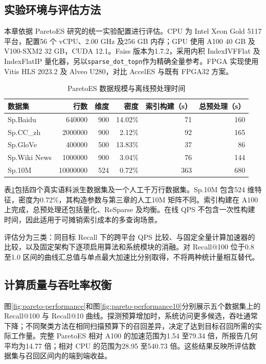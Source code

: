 \subsection{实验环境与评估方法}
本章依据 ParetoES 研究的统一实验配置进行评估\cite{paretoes2026}。CPU 为 Intel Xeon Gold 5117 平台，配置56 个 vCPU、2.00 GHz 及256 GB 内存；GPU 使用 A100 40 GB 及 V100-SXM2 32 GB，CUDA 12.1。Faiss 版本为1.7.2，采用内积 IndexIVFFlat 及 IndexFlatIP 量化器，另以\texttt{sparse\_dot\_topn}作为精确全量参考。FPGA 实现使用 Vitis HLS 2023.2 及 Alveo U280，对比 AccelES 与既有 FPGA32 方案。

\begin{table}[htbp]\centering
\caption{ParetoES 数据规模与离线预处理时间}\label{tab:pareto-data}
\begin{tabular}{lrrrrr}\toprule
数据集&行数&维度&密度&索引构建（s）&总预处理（s）\\\midrule
Sp.Baidu&640000&900&14.02\%&71&160\\
Sp.CC\_zh&2000000&900&2.12\%&92&165\\
Sp.GloVe&400000&500&13.83\%&37&86\\
Sp.Wiki News&1000000&900&3.04\%&76&144\\
Sp.10M&10000000&524&0.72\%&363&680\\\bottomrule
\end{tabular}
\end{table}

表\ref{tab:pareto-data}包括四个真实语料派生数据集及一个人工千万行数据集。Sp.10M 包含524 维特征，密度为0.72\%，其构造参数与第三章的人工10M 矩阵不同。索引构建在 A100 上完成，总预处理还包括量化、ReSparse 及均衡。在线 QPS 不包含一次性构建时间，因此适用于可摊销索引成本的多查询场景。

评估分为三类：同目标 Recall 下的跨平台 QPS 比较、与固定全量计算加速器的比较，以及固定架构下逐项启用算法和系统模块的消融。对 Recall@100 位于0.8 至1.0 区间的曲线汇总值与单点最大加速比分别取得，不将两种统计量相互替代。

\subsection{计算质量与吞吐率权衡}
图\ref{fig:pareto-performance}和图\ref{fig:pareto-performance10}分别展示五个数据集上的 Recall@100 与 Recall@10 曲线。探测预算增加时，系统访问更多候选，吞吐通常下降；不同聚类方法在相同扫描预算下的召回差异，决定了达到目标召回所需的实际工作量。完整 ParetoES 相对 A100 的加速范围为1.54 至79.34 倍，所报告几何平均为14.77 倍；相对 CPU 的范围为28.95 至540.73 倍。这些结果反映所评估数据集与召回区间内的端到端收益。

